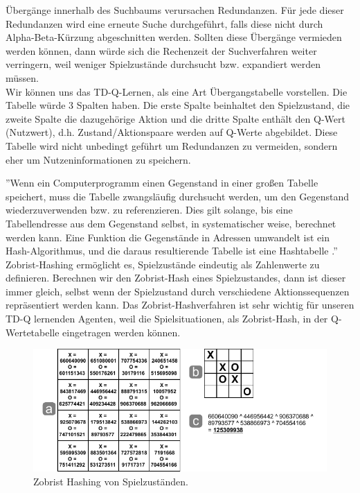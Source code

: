 Übergänge innerhalb des Suchbaums verursachen Redundanzen. Für jede dieser Redundanzen wird eine erneute Suche durchgeführt, falls diese nicht durch Alpha-Beta-Kürzung abgeschnitten werden. Sollten diese Übergänge vermieden werden können, dann würde sich die Rechenzeit der Suchverfahren weiter verringern, weil weniger Spielzustände durchsucht bzw. expandiert werden müssen. \\

Wir können uns das TD-Q-Lernen, als eine Art Übergangstabelle vorstellen. Die Tabelle würde 3 Spalten haben. Die erste Spalte beinhaltet den Spielzustand, die zweite Spalte die dazugehörige Aktion und die dritte Spalte enthält den Q-Wert (Nutzwert), d.h. Zustand/Aktionspaare werden auf Q-Werte abgebildet. Diese Tabelle wird nicht unbedingt geführt um Redundanzen zu vermeiden, sondern eher um Nutzeninformationen zu speichern.

''Wenn ein Computerprogramm einen Gegenstand in einer großen Tabelle speichert, muss die Tabelle zwangsläufig durchsucht werden, um den Gegenstand wiederzuverwenden bzw. zu referenzieren. Dies gilt solange, bis eine Tabellendresse aus dem Gegenstand selbst, in systematischer weise, berechnet werden kann. Eine Funktion die Gegenstände in Adressen umwandelt ist ein Hash-Algorithmus, und die daraus resultierende Tabelle ist eine Hashtabelle \cite[3]{Zobrist}.'' \\

Zobrist-Hashing ermöglicht es, Spielzustände eindeutig als Zahlenwerte zu definieren. Berechnen wir den Zobrist-Hash eines Spielzustandes, dann ist dieser immer gleich, selbst wenn der Spielzustand durch verschiedene Aktionssequenzen repräsentiert werden kann. Das Zobrist-Hashverfahren ist sehr wichtig für unseren TD-Q lernenden Agenten, weil die Spielsituationen, als Zobrist-Hash, in der Q-Wertetabelle eingetragen werden können.

\begin{figure}[!htbp]
  \centering
  \includegraphics[scale = 1.3]{inhalt/abbildungen/zobrist_hash_tictactoe.pdf}
  \caption{Zobrist Hashing von Spielzuständen.}
  \label{fig:zobrist_hash_tictactoe}
\end{figure} 


